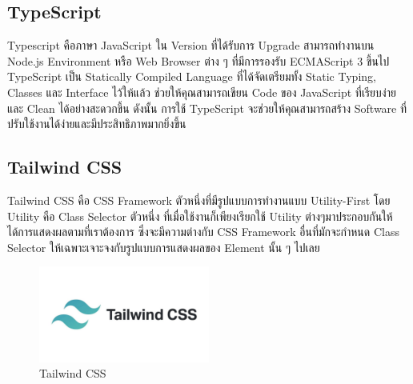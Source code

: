 \subsection{TypeScript}
Typescript \cite{web:typescript} คือภาษา JavaScript ใน Version ที่ได้รับการ Upgrade สามารถทำงานบน Node.js Environment หรือ Web Browser ต่าง ๆ ที่มีการรองรับ ECMAScript 3 ขึ้นไป TypeScript เป็น Statically Compiled Language ที่ได้จัดเตรียมทั้ง Static Typing, Classes และ Interface ไว้ให้แล้ว ช่วยให้คุณสามารถเขียน Code ของ JavaScript ที่เรียบง่ายและ Clean ได้อย่างสะดวกขึ้น ดังนั้น การใช้ TypeScript จะช่วยให้คุณสามารถสร้าง Software ที่ปรับใช้งานได้ง่ายและมีประสิทธิภาพมากยิ่งขึ้น

\subsection{Tailwind CSS}
Tailwind CSS \cite{web:tailwind} คือ CSS \cite{web:css} Framework ตัวหนึ่งที่มีรูปแบบการทำงานแบบ Utility-First โดย Utility คือ Class Selector ตัวหนึ่ง ที่เมื่อใช้งานก็เพียงเรียกใช้ Utility ต่างๆมาประกอบกันให้ได้การแสดงผลตามที่เราต้องการ ซึ่งจะมีความต่างกับ CSS Framework อื่นที่มักจะกำหนด Class Selector ให้เฉพาะเจาะจงกับรูปแบบการแสดงผลของ Element นั้น ๆ ไปเลย
\begin{figure}
    \centering
    \includegraphics[width=0.5\textwidth]{img/tailwind.jpg}
    \caption{Tailwind CSS}
    \label{fig:tailwind}
\end{figure}
